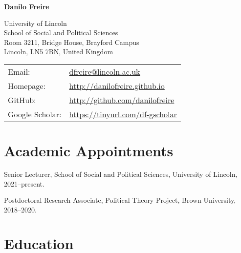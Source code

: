 \documentclass[a4paper]{article}
\def\name{Danilo Freire}
\renewenvironment{itemize}{
	\begin{list}{}{
			\setlength{\leftmargin}{1.5em}
		}
		}{
	\end{list}
}
\begin{document}
{\huge \bf \name}


\vspace{0.25in}

\begin{minipage}{0.45\linewidth}
	University of Lincoln\\
  School of Social and Political Sciences\\
	Room 3211, Bridge House, Brayford Campus\\
	Lincoln, LN5 7BN, United Kingdom
\end{minipage}
\begin{minipage}{0.45\linewidth}
	\begin{tabular}{ll}
		Email:          & \href{mailto:dfreire@lincoln.ac.uk}{dfreire@lincoln.ac.uk}          \\
		Homepage:       & \href{http://danilofreire.github.io/}{http://danilofreire.github.io} \\
		GitHub:         & \href{http://github.com/danilofreire}{http://github.com/danilofreire} \\
    Google Scholar: & \href{https://tinyurl.com/df-gscholar}{https://tinyurl.com/df-gscholar}
	\end{tabular}
	\end{minipage}

\section*{Academic Appointments}

\begin{itemize}
\item Senior Lecturer, School of Social and Political Sciences, University of Lincoln, 2021--present.
\item Postdoctoral Research Associate, Political Theory Project, Brown University, 2018--2020.
\end{itemize}

\section*{Education}
\end{document}
